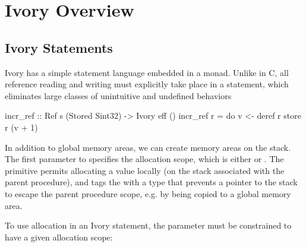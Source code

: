 \section{Ivory Overview}
\label{sec:ivory-overview}






\subsection{Ivory Statements}

Ivory has a simple statement language embedded in a monad. Unlike in C, all
reference reading and writing must explicitly take place in a statement, which
eliminates large classes of unintuitive and undefined behaviors 

\begin{code}
incr_ref :: Ref s (Stored Sint32) -> Ivory eff ()
incr_ref r = do
    v <- deref r
    store r (v + 1)
\end{code}

In addition to global memory areas, we can create memory areas on the stack.
The first parameter to  specifies the allocation scope, which is either
 or . The  primitive permits allocating a value
locally (on the stack associated with the parent procedure), and tags the
 with a type that prevents a pointer to the stack to escape the parent
procedure scope, e.g. by being copied to a global memory area.

To use allocation in an Ivory statement, the  parameter must be
constrained to have a given allocation scope:

